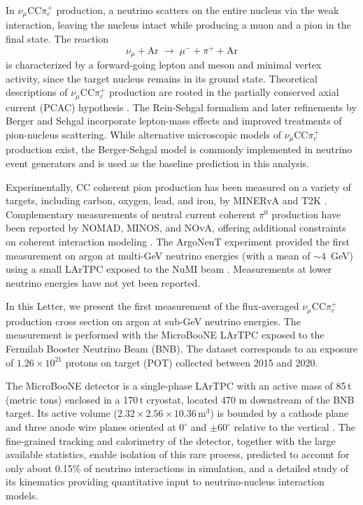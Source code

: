 \documentclass[aps,prl,reprint,superscriptaddress,nofootinbib, showpacs]{revtex4-2}
\begin{document}
In $\nu_\mu$CC$\pi^+_c$ production, a neutrino scatters on the entire nucleus via the weak interaction, leaving the nucleus intact while producing a muon and a pion in the final state. The reaction
\[
\nu_{\mu} + \mathrm{Ar} \;\rightarrow\; \mu^{-} + \pi^{+} + \mathrm{Ar}
\]
is characterized by a forward-going lepton and meson and minimal vertex activity, since the target nucleus remains in its ground state. Theoretical descriptions of $\nu_\mu$CC$\pi^+_c$ production are rooted in the partially conserved axial current (PCAC) hypothesis \cite{ReinSehgal1983}. The Rein-Sehgal formalism \cite{ReinSehgal_Update} and later refinements by Berger and Sehgal \cite{BergerSehgal_2009} incorporate lepton-mass effects and improved treatments of pion-nucleus scattering. While alternative microscopic models of $\nu_\mu$CC$\pi^+_c$ production exist, the Berger-Sehgal model is commonly implemented in neutrino event generators and is used as the baseline prediction in this analysis.

Experimentally, CC coherent pion production has been measured on a variety of targets, including carbon, oxygen, lead, and iron, by MINERvA and T2K \cite{MINERvA_CohCC,T2K_CohCC, T2K_CohCC_2023}. Complementary measurements of neutral current coherent $\pi^0$ production have been reported by NOMAD,  MINOS, and NOvA, offering additional constraints on coherent interaction modeling \cite{KULLENBERG2009177, PhysRevD.94.072006, PhysRevD.102.012004}. The ArgoNeuT experiment provided the first measurement on argon at multi-GeV neutrino energies (with a mean of $\sim 4$~GeV) using a small LArTPC exposed to the NuMI beam \cite{ArgoNeuT2014}. Measurements at lower neutrino energies have not yet been reported. 

In this Letter, we present the first measurement of the flux-averaged $\nu_\mu$CC$\pi^+_c$ production cross section on argon at sub-GeV neutrino energies. The measurement is performed with the MicroBooNE  LArTPC \cite{MicroBooNE_Detector} exposed to the Fermilab Booster Neutrino Beam (BNB). The dataset corresponds to an exposure of $1.26\times10^{21}$ protons on target (POT) collected between 2015 and 2020. 

The MicroBooNE detector is a single-phase LArTPC with an active mass of 85\,t (metric tons) enclosed in a 170\,t cryostat, located 470 m downstream of the BNB target. Its active volume ($2.32\times2.56\times10.36 \, \text{m}^3$) is bounded by a cathode plane and three anode wire planes oriented at $0^{\circ}$ and $\pm60^{\circ}$ relative to the vertical \cite{MicroBooNE_Detector}. The fine-grained tracking and calorimetry of the detector, together with the large available statistics, enable isolation of this rare process, predicted to account for only about 0.15\% of neutrino interactions in simulation, and a detailed study of its kinematics providing quantitative input to neutrino-nucleus interaction models.
\end{document}

